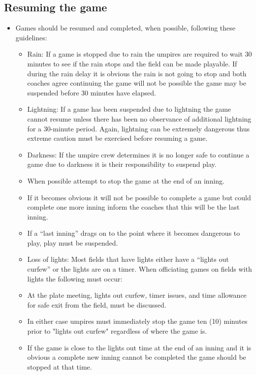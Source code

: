 \documentclass[letterpaper,11pt,colorlinks=true,allcolors=blue]{article}
\begin{document}
\subsection*{Resuming the game}
\begin{itemize}
\item Games should be resumed and completed, when possible, following these guidelines:
\begin{itemize}
\item  Rain: If a game is stopped due to rain the umpires are required to wait 30 minutes to see if the rain stops and the field can be made playable. If during the rain delay it is obvious the rain is not going to stop and both coaches agree continuing the game will not be possible the game may be suspended before 30 minutes have elapsed. 
\item  Lightning: If a game has been suspended due to lightning the game cannot resume unless there has been no observance of additional lightning for a 30-minute period. Again, lightning can be extremely dangerous thus extreme caution must be exercised before resuming a game.
\item  Darkness: If the umpire crew determines it is no longer safe to continue a game due to darkness it is their responsibility to suspend play. 
\item  When possible attempt to stop the game at the end of an inning.
\item  If it becomes obvious it will not be possible to complete a game but could complete one more inning inform the coaches that this will be the last inning.
\item  If a “last inning” drags on to the point where it becomes dangerous to play, play must be suspended. 
\item  Loss of lights: Most fields that have lights either have a “lights out curfew” or the lights are on a timer. When officiating games on fields with lights the following must occur:
\item  At the plate meeting, lights out curfew, timer issues, and time allowance for safe exit from the field, must be discussed.
\item  In either case umpires must immediately stop the game ten (10) minutes prior to "lights out curfew" regardless of where the game is.
\item  If the game is close to the lights out time at the end of an inning and it is obvious a complete new inning cannot be completed the game should be stopped at that time. 
\end{itemize}
\end{itemize}
\end{document}
